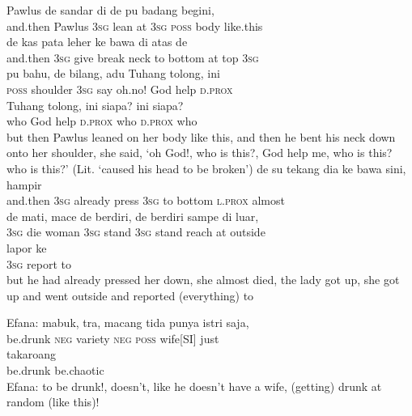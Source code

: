 \ea
{}    {Pawlus}    {de}    {sandar}    {di}    {de}    {pu}    {badang}    {begini,}\\
   {and.then}    {Pawlus}    {\textsc{3sg}}    {lean}    {at}    {\textsc{3sg}}    {\textsc{poss}}    {body}    {like.this}\\
   de    {kas}    {pata}    {leher}    {ke}    {bawa}    {di}    {atas}   de\\
   {and.then}   \textsc{3sg}    {give}    {break}    {neck}    {to}    {bottom}    {at}    {top}   \textsc{3sg}\\
\gll pu    {bahu,}    {de}    {bilang,}    {adu}    {Tuhang}    {tolong,}    {ini}\\
  \textsc{poss}    {shoulder}    {\textsc{3sg}}    {say}    {oh.no!}    {God}    {help}    {\textsc{d.prox}}\\
    {Tuhang}    {tolong,}    {ini}    {siapa?}    {ini}    {siapa?}\\
   {who}    {God}    {help}    {\textsc{d.prox}}    {who}    {\textsc{d.prox}}    {who}\\
\glt
but then Pawlus leaned on her body like this, and then he bent his neck down onto her shoulder, she said, ‘oh God!, who is this?, God help me, who is this? who is this?’ (Lit. ‘caused his head to be broken’)
\z
\ea
{}    {de}    {su}    {tekang}    {dia}    {ke}    {bawa}    {sini,}    {hampir}\\
   {and.then}    {\textsc{3sg}}    {already}    {press}    {\textsc{3sg}}    {to}    {bottom}    {\textsc{l.prox}}    {almost}\\
\gll de    {mati,}    {mace}    {de}    {berdiri,}    {de}    {berdiri}    {sampe}    {di}   luar,\\
  \textsc{3sg}    {die}    {woman}    {\textsc{3sg}}    {stand}    {\textsc{3sg}}    {stand}    {reach}    {at}   outside\\
    {lapor}    {ke}\\
   {\textsc{3sg}}    {report}    {to}\\
\glt
but he had already pressed her down, she almost died, the lady got up, she got up and went outside and reported (everything) to
\z

\ea
\gll   Efana:    {mabuk,}   tra,   macang   tida   punya   istri   saja,\\
 {}  {be.drunk}   \textsc{neg}   variety   \textsc{neg}   \textsc{poss}   wife[SI]   just\\
    {takaroang}\\
   {be.drunk}    {be.chaotic}\\
\glt
Efana: to be drunk!, doesn’t, like he doesn’t have a wife, (getting) drunk at random (like this)!
\z

